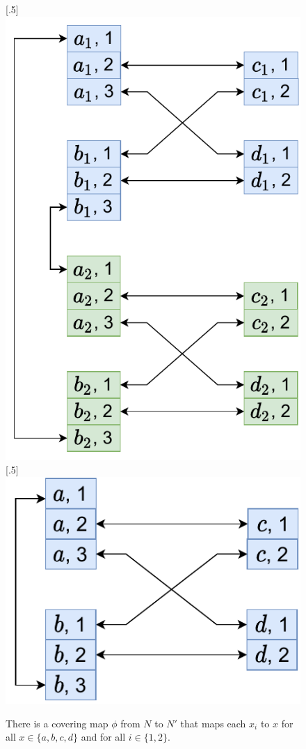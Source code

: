 \begin{figure}[H]
    [.5\linewidth] {
    \centering
    \includegraphics[scale=0.55]{diagrams/covering_map_1.pdf}
  }
  \hfill
    [.5\linewidth] {
    \centering
    \includegraphics[scale=0.55]{diagrams/covering_map_2.pdf}
  }
  \caption{There is a covering map $\phi$ from $N$ to $N'$ that maps each $x_i$ to $x$ for all $x\in \{a, b, c, d\}$ and for all $i \in \{1, 2\}$.
  }
  \label{fig:covering_map1}
\end{figure}

